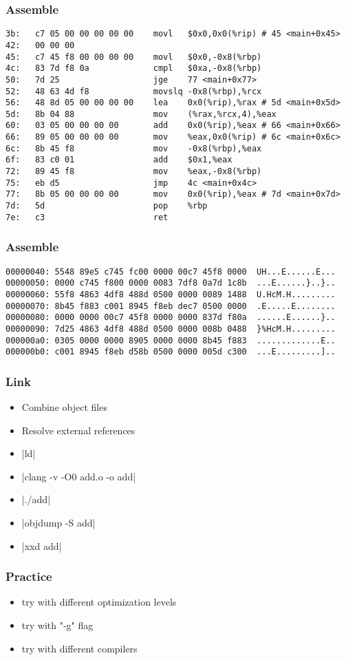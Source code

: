 \begin{frame}[fragile]
    \frametitle{Assemble}
    \begin{verbatim}
3b:   c7 05 00 00 00 00 00    movl   $0x0,0x0(%rip) # 45 <main+0x45>
42:   00 00 00 
45:   c7 45 f8 00 00 00 00    movl   $0x0,-0x8(%rbp)
4c:   83 7d f8 0a             cmpl   $0xa,-0x8(%rbp)
50:   7d 25                   jge    77 <main+0x77>
52:   48 63 4d f8             movslq -0x8(%rbp),%rcx
56:   48 8d 05 00 00 00 00    lea    0x0(%rip),%rax # 5d <main+0x5d>
5d:   8b 04 88                mov    (%rax,%rcx,4),%eax
60:   03 05 00 00 00 00       add    0x0(%rip),%eax # 66 <main+0x66>
66:   89 05 00 00 00 00       mov    %eax,0x0(%rip) # 6c <main+0x6c>
6c:   8b 45 f8                mov    -0x8(%rbp),%eax
6f:   83 c0 01                add    $0x1,%eax
72:   89 45 f8                mov    %eax,-0x8(%rbp)
75:   eb d5                   jmp    4c <main+0x4c>
77:   8b 05 00 00 00 00       mov    0x0(%rip),%eax # 7d <main+0x7d>
7d:   5d                      pop    %rbp
7e:   c3                      ret    
    \end{verbatim}

\end{frame}


\begin{frame}[fragile]
    \frametitle{Assemble}
    \begin{verbatim}
00000040: 5548 89e5 c745 fc00 0000 00c7 45f8 0000  UH...E......E...
00000050: 0000 c745 f800 0000 0083 7df8 0a7d 1c8b  ...E......}..}..
00000060: 55f8 4863 4df8 488d 0500 0000 0089 1488  U.HcM.H.........
00000070: 8b45 f883 c001 8945 f8eb dec7 0500 0000  .E.....E........
00000080: 0000 0000 00c7 45f8 0000 0000 837d f80a  ......E......}..
00000090: 7d25 4863 4df8 488d 0500 0000 008b 0488  }%HcM.H.........
000000a0: 0305 0000 0000 8905 0000 0000 8b45 f883  .............E..
000000b0: c001 8945 f8eb d58b 0500 0000 005d c300  ...E.........]..
    \end{verbatim}

\end{frame}

\begin{frame}
    \frametitle{Link}
    \begin{itemize}
        \item Combine object files
        \item Resolve external references
        \item {}|ld|
        \item {}|clang -v -O0 add.o -o add|
        \item {}|./add|
        \item {}|objdump -S add|
        \item {}|xxd add|
    \end{itemize}
\end{frame}

\begin{frame}
    \frametitle{Practice}
    \begin{itemize}
        \item try with different optimization levels
        \item try with "-g" flag
        \item try with different compilers
    \end{itemize}
\end{frame}